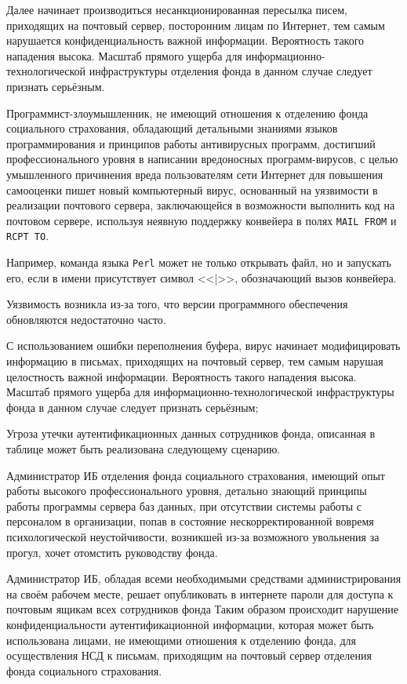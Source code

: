 Далее начинает производиться несанкционированная пересылка писем,
приходящих на почтовый сервер, посторонним лицам по Интернет, тем
самым нарушается конфиденциальность важной информации. Вероятность
такого нападения высока. Масштаб прямого ущерба для
информационно-технологической инфраструктуры отделения фонда в данном
случае следует признать серьёзным.

\point Программист-злоумышленник, не имеющий отношения к отделению
фонда социального страхования, обладающий детальными знаниями языков
программирования и принципов работы антивирусных программ, достигший
профессионального уровня в написании вредоносных программ-вирусов, с
целью умышленного причинения вреда пользователям сети Интернет для
повышения самооценки пишет новый компьютерный вирус, основанный на
уязвимости в реализации почтового сервера, заключающейся в возможности
выполнить код на почтовом сервере, используя неявную поддержку
конвейера в полях \texttt{MAIL FROM} и \texttt{RCPT TO}.

Например, команда языка \texttt{Perl} может не только открывать файл,
но и запускать его, если в имени присутствует символ <<|>>,
обозначающий вызов конвейера.

Уязвимость возникла из-за того, что версии программного обеспечения
обновляются недостаточно часто.

С использованием ошибки переполнения буфера, вирус начинает
модифицировать информацию в письмах, приходящих на почтовый сервер,
тем самым нарушая целостность важной информации. Вероятность такого
нападения высока. Масштаб прямого ущерба для
информационно-технологической инфраструктуры фонда в данном случае
следует признать серьёзным;

\point Угроза утечки аутентификационных данных сотрудников фонда,
описанная в таблице может быть реализована следующему сценарию.

\point Администратор ИБ отделения фонда социального страхования,
имеющий опыт работы высокого профессионального уровня, детально
знающий принципы работы программы сервера баз данных, при отсутствии
системы работы с персоналом в организации, попав в состояние
нескорректированной вовремя психологической неустойчивости, возникшей
из-за возможного увольнения за прогул, хочет отомстить руководству
фонда.

Администратор ИБ, обладая всеми необходимыми средствами
администрирования на своём рабочем месте, решает опубликовать в
интернете пароли для доступа к почтовым ящикам всех сотрудников фонда
Таким образом происходит нарушение конфиденциальности
аутентификационной информации, которая может быть использована лицами,
не имеющими отношения к отделению фонда, для осуществления НСД к
письмам, приходящим на почтовый сервер отделения фонда социального
страхования.

